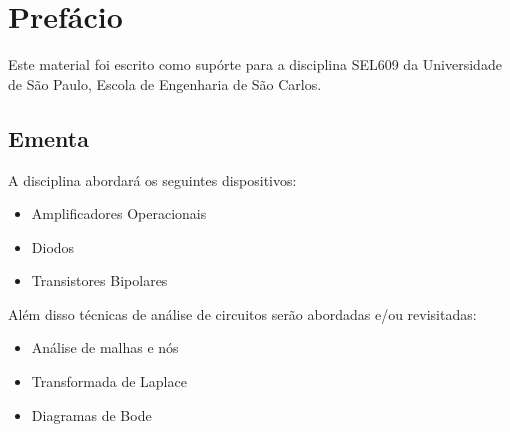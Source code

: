 \chapter*{Prefácio}
Este material foi escrito como supórte para a disciplina SEL609 da Universidade de São Paulo, Escola de Engenharia de São Carlos.

\section*{Ementa}
A disciplina abordará os seguintes dispositivos:
\begin{itemize}
  \item Amplificadores Operacionais
  \item Diodos 
  \item Transistores Bipolares 
\end{itemize}

Além disso técnicas de análise de circuitos serão abordadas e/ou revisitadas:
\begin{itemize}
  \item Análise de malhas e nós 
  \item Transformada de Laplace
  \item Diagramas de Bode
\end{itemize}


